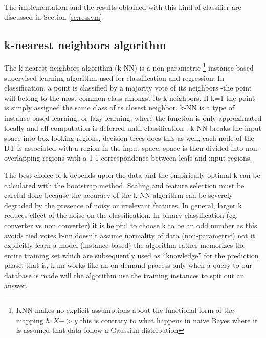\documentclass[11pt]{article}
\theoremstyle{definition}
\theoremstyle{remark}
\begin{document}
{The implementation and the results obtained with this kind of classifier are discussed in Section \ref{se:ressvm}.

\subsection{k-nearest neighbors algorithm}
\label{se:reskneighbors}
The k-nearest neighbors algorithm (k-NN) is a non-parametric \footnote{KNN makes no explicit assumptions about the functional form of the mapping $h:X->y$ this is contrary to what happens in naive Bayes where it is assumed that data follow a Gaussian distribution} instance-based supervised learning algorithm used for classification and regression. In classification, a point is classified by a majority vote of its neighbors -the point will belong to the most common class amongst its k neighbors. If k=1 the point is simply assigned the same class of ts closest neighbor.
k-NN is a type of instance-based learning, or lazy learning, where the function is only approximated locally and all computation is deferred until classification \cite{keller1985fuzzy}. k-NN breaks the input space into box looking regions, decision trees does this as well, each node of the DT is associated with a region in the input space, space is then divided into non-overlapping regions with a 1-1 correspondence between leafs and input regions.

The best choice of k depends upon the data and the empirically optimal k can be calculated with the bootstrap method. Scaling and feature selection must be careful done because the accuracy of the k-NN algorithm can be severely degraded by the presence of noisy or irrelevant features. In general, larger k reduces effect of the noise on the classification. In binary classification (eg. converter vs non converter) it is helpful to choose k to be an odd number as this avoids tied votes
k-nn doesn't assume normality of data (non-parametric) not it explicitly learn a model (instance-based) the algorithm rather memorizes the entire training set which are subsequently used as “knowledge” for the prediction phase, that is, k-nn works like an on-demand process only when a query to our database is made will the algorithm use the training instances to spit out an answer. 

}
\end{document}
